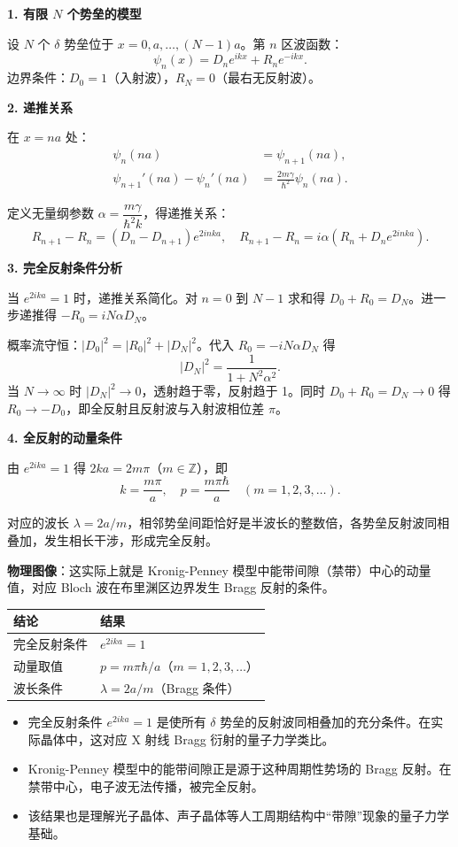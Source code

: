 \begin{derivationbox}[标准解题过程]
\textbf{1. 有限 $N$ 个势垒的模型}

设 $N$ 个 $\delta$ 势垒位于 $x=0,a,\ldots,(N-1)a$。第 $n$ 区波函数：
\[
\psi_n(x)=D_ne^{ikx}+R_ne^{-ikx}.
\]
边界条件：$D_0=1$（入射波），$R_N=0$（最右无反射波）。

\textbf{2. 递推关系}

在 $x=na$ 处：
\begin{align*}
\psi_n(na)&=\psi_{n+1}(na),\\
\psi_{n+1}'(na)-\psi_n'(na)&=\frac{2m\gamma}{\hbar^2}\psi_n(na).
\end{align*}

定义无量纲参数 $\alpha=\dfrac{m\gamma}{\hbar^2k}$，得递推关系：
\[
R_{n+1}-R_n=(D_n-D_{n+1})e^{2inka},\quad R_{n+1}-R_n=i\alpha(R_n+D_ne^{2inka}).
\]

\textbf{3. 完全反射条件分析}

当 $e^{2ika}=1$ 时，递推关系简化。对 $n=0$ 到 $N-1$ 求和得 $D_0+R_0=D_N$。进一步递推得 $-R_0=iN\alpha D_N$。

概率流守恒：$|D_0|^2=|R_0|^2+|D_N|^2$。代入 $R_0=-iN\alpha D_N$ 得
\[
|D_N|^2=\frac{1}{1+N^2\alpha^2}.
\]
当 $N\to\infty$ 时 $|D_N|^2\to0$，透射趋于零，反射趋于 1。同时 $D_0+R_0=D_N\to0$ 得 $R_0\to-D_0$，即全反射且反射波与入射波相位差 $\pi$。

\textbf{4. 全反射的动量条件}

由 $e^{2ika}=1$ 得 $2ka=2m\pi$（$m\in\mathbb{Z}$），即
\begin{equation}
\boxed{k=\frac{m\pi}{a},\quad p=\frac{m\pi\hbar}{a}\quad(m=1,2,3,\ldots).}
\end{equation}

对应的波长 $\lambda=2a/m$，相邻势垒间距恰好是半波长的整数倍，各势垒反射波同相叠加，发生相长干涉，形成完全反射。

\textbf{物理图像}：这实际上就是 Kronig-Penney 模型中能带间隙（禁带）中心的动量值，对应 Bloch 波在布里渊区边界发生 Bragg 反射的条件。
\end{derivationbox}

\begin{formulabox}[答案汇总]
\begin{center}
\begin{tabular}{ll}
\toprule
\textbf{结论} & \textbf{结果} \\
\midrule
完全反射条件 & $e^{2ika}=1$ \\
动量取值 & $p=m\pi\hbar/a$（$m=1,2,3,\ldots$） \\
波长条件 & $\lambda=2a/m$（Bragg 条件） \\
\bottomrule
\end{tabular}
\end{center}
\end{formulabox}

\begin{insightbox}[物理图像]
\begin{itemize}
    \item 完全反射条件 $e^{2ika}=1$ 是使所有 $\delta$ 势垒的反射波同相叠加的充分条件。在实际晶体中，这对应 X 射线 Bragg 衍射的量子力学类比。
    \item Kronig-Penney 模型中的能带间隙正是源于这种周期性势场的 Bragg 反射。在禁带中心，电子波无法传播，被完全反射。
    \item 该结果也是理解光子晶体、声子晶体等人工周期结构中``带隙''现象的量子力学基础。
\end{itemize}
\end{insightbox}
